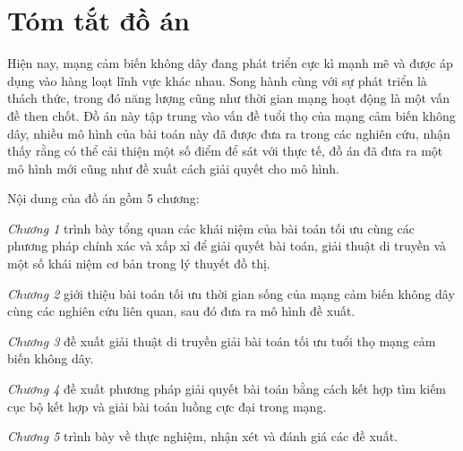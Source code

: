 \chapter*{Tóm tắt đồ án}
Hiện nay, mạng cảm biến không dây đang phát triển cực kì mạnh mẽ và được áp dụng vào hàng loạt lĩnh vực khác nhau. Song hành cùng với sự phát triển là thách thức, trong đó năng lượng cũng như thời gian mạng hoạt động là một vấn đề then chốt. Đồ án này tập trung vào vấn đề tuổi thọ của mạng cảm biến không dây, nhiều mô hình của bài toán này đã được đưa ra trong các nghiên cứu, nhận thấy rằng có thể cải thiện một số điểm để sát với thực tế, đồ án đã đưa ra một mô hình mới cũng như đề xuất cách giải quyết cho mô hình.

Nội dung của đồ án gồm 5 chương:

\textit{Chương 1} trình bày tổng quan các khái niệm của bài toán tối ưu cùng các phương pháp chính xác và xấp xỉ để  giải quyết bài toán, giải thuật di truyền và một số khái niệm cơ bản trong lý thuyết đồ thị.

\textit{Chương 2} giới thiệu bài toán tối ưu thời gian sống của mạng cảm biến không dây cùng các nghiên cứu liên quan, sau đó đưa ra mô hình đề xuất.

\textit{Chương 3} đề xuất giải thuật di truyền giải bài toán tối ưu tuổi thọ mạng cảm biến không dây.

\textit{Chương 4} đề xuất phương pháp giải quyết bài toán bằng cách kết hợp tìm kiếm cục bộ kết hợp và giải bài toán luồng cực đại trong mạng.

\textit{Chương 5} trình bày về thực nghiệm, nhận xét và đánh giá các đề xuất.